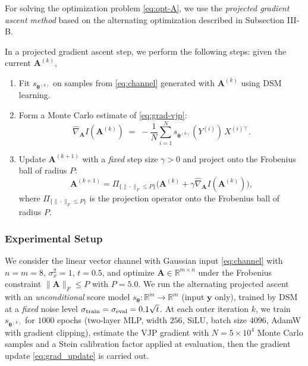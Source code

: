 \documentclass[conference]{IEEEtran}
\begin{document}

For solving the optimization problem \eqref{eq:opt-A}, 
we use the {\em projected gradient ascent method} based on the alternating optimization
described in Subsection III-B.

In a projected gradient ascent step, we perform the following steps:
given the current $\bm A^{(k)}$, 
\begin{enumerate}
\item Fit $s_{\bm \theta^{(k)}}$ on samples from \eqref{eq:channel} generated with $\bm A^{(k)}$ using DSM learning.
\item Form a Monte Carlo estimate of \eqref{eq:grad-vjp}:
\begin{equation}
\label{eq:grad-vjp}
\widehat{\nabla}_{\!\bm A} I(\bm A^{(k)}) \;=\; -\frac{1}{N}\sum_{i=1}^N s_{\bm \theta^{(k)}}(Y^{(i)})\,X^{(i)\top}.
\end{equation}
\item Update $\bm A^{(k+1)}$ with a \emph{fixed} 
step size $\gamma >0$ and project onto the Frobenius ball of radius $P$:
\begin{equation}
\label{eq:grad_update}
\bm A^{(k+1)} = \Pi_{\{\|\cdot\|_F\le P\}}\!\Big(\bm A^{(k)} 
+ \gamma \widehat{\nabla}_{\!\bm A} I(\bm A^{(k)})\Big),
\end{equation}
where $\Pi_{\{\|\cdot\|_F\le P\}}$ is the projection operator onto the Frobenius ball of radius $P$.
\end{enumerate}

\subsubsection{Experimental Setup}
We consider the linear vector channel with Gaussian input \eqref{eq:channel} 
with $n=m=8$, $\sigma_x^2=1$, $t=0.5$, 
and optimize $\bm A\in\mathbb R^{m\times n}$ 
under the Frobenius constraint $\|\bm A\|_F\le P$ with $P=5.0$. 
We run the alternating projected ascent with an \emph{unconditional} score model 
$s_{\bm \theta}:\mathbb R^m\to\mathbb R^m$ (input $\bm y$ only), 
trained by DSM at a \emph{fixed} noise level 
$\sigma_{\rm train}=\sigma_{\rm eval}=0.1\sqrt t$. 
At each outer iteration $k$, we train $s_{\bm \theta^{(k)}}$ for $1000$ 
epochs (two-layer MLP, width $256$, SiLU, batch size $4096$, AdamW with gradient clipping), 
estimate the VJP gradient with $N=5\times 10^4$ 
Monte Carlo samples and a Stein calibration 
factor applied at evaluation, then the gradient update
\eqref{eq:grad_update} is carried out.
\end{document}
